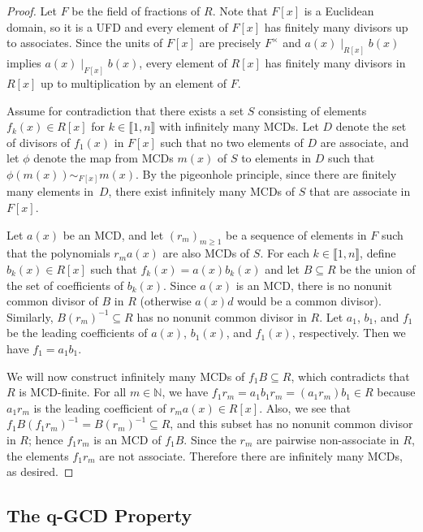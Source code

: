\documentclass[10pt]{amsart}
\theoremstyle{definition}
\theoremstyle{remark}
\numberwithin{equation}{section}
\newcommand{\nn}{\mathbb{N}}
\providecommand\ldb{\llbracket}
\providecommand\rdb{\rrbracket}
\begin{document}
\begin{proof}
  Let $F$ be the field of fractions of $R$. Note that $F[x]$ is a Euclidean domain, so it is a UFD and every element of $F[x]$ has finitely many divisors up to associates. Since the units of $F[x]$ are precisely $F^\times$ and $a(x) \mid_{R[x]} b(x)$ implies $a(x) \mid_{F[x]} b(x)$, every element of $R[x]$ has finitely many divisors in $R[x]$ up to multiplication by an element of $F$.

  Assume for contradiction that there exists a set $S$ consisting of elements $f_k(x) \in R[x]$ for $k \in \ldb 1, n \rdb$ with infinitely many MCDs. Let $D$ denote the set of divisors of $f_1(x)$ in $F[x]$ such that no two elements of $D$ are associate, and let $\phi$ denote the map from MCDs $m(x)$ of $S$ to elements in $D$ such that $\phi(m(x)) \sim_{F[x]} m(x)$. By the pigeonhole principle, since there are finitely many elements in~$D$, there exist infinitely many MCDs of $S$ that are associate in $F[x]$.

  Let $a(x)$ be an MCD, and let $(r_m)_{m \ge 1}$ be a sequence of elements in $F$ such that the polynomials $r_m a(x)$ are also MCDs of $S$. For each $k \in \ldb 1, n \rdb$, define $b_k(x) \in R[x]$ such that $f_k(x) = a(x) b_k(x)$ and let $B \subseteq R$ be the union of the set of coefficients of $b_k(x)$. Since $a(x)$ is an MCD, there is no nonunit common divisor of $B$ in $R$ (otherwise $a(x) d$ would be a common divisor). Similarly, $B(r_m)^{-1} \subseteq R$ has no nonunit common divisor in $R$. Let $a_1$, $b_1$, and $f_1$ be the leading coefficients of $a(x)$, $b_1(x)$, and $f_1(x)$, respectively. Then we have $f_1 = a_1b_1$.

  We will now construct infinitely many MCDs of $f_1 B \subseteq R$, which contradicts that $R$ is MCD-finite. For all $m \in \nn$, we have $f_1 r_m = a_1b_1r_m = (a_1 r_m)b_1 \in R$ because $a_1 r_m$ is the leading coefficient of $r_m a(x) \in R[x]$. Also, we see that $f_1B (f_1 r_m)^{-1} = B(r_m)^{-1} \subseteq R$, and this subset has no nonunit common divisor in $R$; hence $f_1 r_m$ is an MCD of $f_1 B$. Since the $r_m$ are pairwise non-associate in $R$, the elements $f_1 r_m$ are not associate. Therefore there are infinitely many MCDs, as desired.
\end{proof}



\medskip
\subsection{The q-GCD Property}
\end{document}
